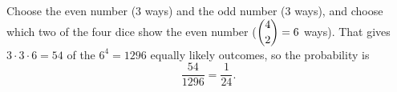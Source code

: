 Choose the even number ($3$ ways) and the odd number ($3$ ways), and choose which two of the four dice show the even number ($\dbinom42=6$ ways). That gives $3\cdot3\cdot6=54$ of the $6^4=1296$ equally likely outcomes, so the probability is
\[
\dfrac{54}{1296}=\boxed{\dfrac{1}{24}}.
\]
